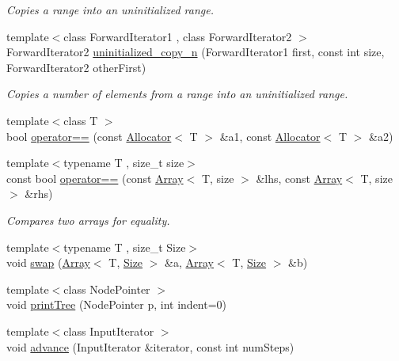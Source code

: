 \begin{DoxyCompactItemize}
\begin{DoxyCompactList}\small\item\em Copies a range into an uninitialized range. \end{DoxyCompactList}\item 
{\footnotesize template$<$class Forward\+Iterator1 , class Forward\+Iterator2 $>$ }\\Forward\+Iterator2 \hyperlink{namespaceprism_ad1c7d8eb38174ba66d98321b68047e6e}{uninitialized\+\_\+copy\+\_\+n} (Forward\+Iterator1 first, const int size, Forward\+Iterator2 other\+First)
\begin{DoxyCompactList}\small\item\em Copies a number of elements from a range into an uninitialized range. \end{DoxyCompactList}\item 
{\footnotesize template$<$class T $>$ }\\bool \hyperlink{namespaceprism_a1faf99d35e2cbb2b8c0644aa0b777e9b}{operator==} (const \hyperlink{classprism_1_1_allocator}{Allocator}$<$ T $>$ \&a1, const \hyperlink{classprism_1_1_allocator}{Allocator}$<$ T $>$ \&a2)
\item 
{\footnotesize template$<$typename T , size\+\_\+t size$>$ }\\const bool \hyperlink{namespaceprism_a23cc68e19002deb7797ff9eaa10523db}{operator==} (const \hyperlink{classprism_1_1_array}{Array}$<$ T, size $>$ \&lhs, const \hyperlink{classprism_1_1_array}{Array}$<$ T, size $>$ \&rhs)
\begin{DoxyCompactList}\small\item\em Compares two arrays for equality. \end{DoxyCompactList}\item 
{\footnotesize template$<$typename T , size\+\_\+t Size$>$ }\\void \hyperlink{namespaceprism_aff86329b54a13cb753f2c79156f68bb4}{swap} (\hyperlink{classprism_1_1_array}{Array}$<$ T, \hyperlink{classprism_1_1_size}{Size} $>$ \&a, \hyperlink{classprism_1_1_array}{Array}$<$ T, \hyperlink{classprism_1_1_size}{Size} $>$ \&b)
\item 
{\footnotesize template$<$class Node\+Pointer $>$ }\\void \hyperlink{namespaceprism_a3ec96a679831176af1c6f2b7480226e1}{print\+Tree} (Node\+Pointer p, int indent=0)
\item 
{\footnotesize template$<$class Input\+Iterator $>$ }\\void \hyperlink{namespaceprism_a667eee76b54258f4f3530eaa7ef44d69}{advance} (Input\+Iterator \&iterator, const int num\+Steps)

\end{DoxyCompactItemize}
